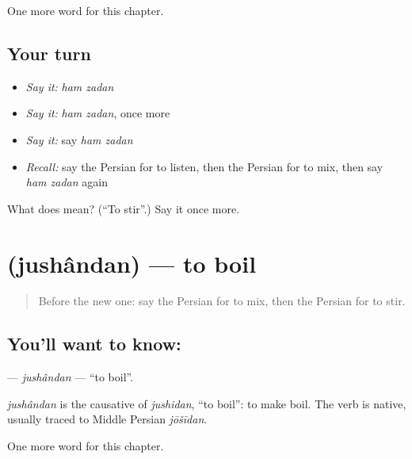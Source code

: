 \begin{grammarlens}[title={What you've built}]
One more word for this chapter.
\end{grammarlens}

\subsection*{Your turn}
\begin{itemize}
\raggedright
  \item \emph{Say it:} \emph{ham zadan}
  \item \emph{Say it:} \emph{ham zadan}, once more
  \item \emph{Say it:} say \emph{ham zadan}
  \item \emph{Recall:} say the Persian for to listen, then the Persian for to mix, then say \emph{ham zadan} again
\end{itemize}

\begin{tcolorbox}[breakable,colback=teal!4,colframe=teal!35!black,title={Before you move on}]
What does   mean? (\textquotedblleft{}To stir\textquotedblright{}.) Say it once more.
\end{tcolorbox}
\section[\texorpdfstring{\fa{جوشاندن} (jushândan)}{جوشاندن (jushândan)}]{ (jushândan) — to boil}

\label{lesson:FA-C180-jushandan}



\begin{quote}
Before the new one: say the Persian for to mix, then the Persian for to stir.
\end{quote}

\subsection*{You'll want to know: }
\textbf{} — \emph{jushândan} — \textquotedblleft{}to boil\textquotedblright{}.

\begin{cousinweb}
\emph{jushândan} is the causative of \emph{jushidan}, \textquotedblleft{}to boil\textquotedblright{}: to make boil. The verb is native, usually traced to Middle Persian \emph{jōšīdan}.
\end{cousinweb}

\begin{grammarlens}[title={What you've built}]
One more word for this chapter.
\end{grammarlens}

